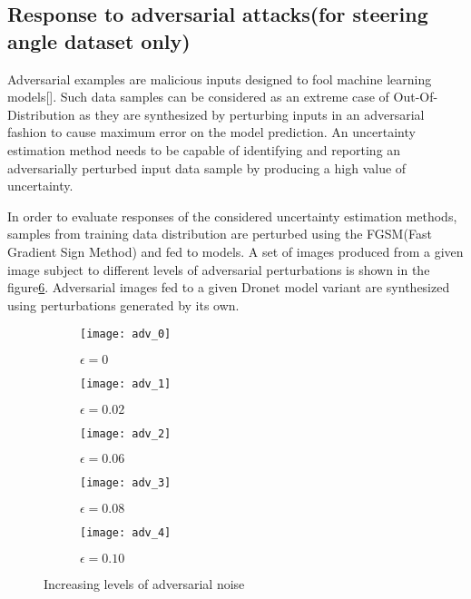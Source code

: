 \subsection{Response to adversarial attacks(for steering angle dataset only)}
Adversarial examples are malicious inputs designed to fool machine learning models[\cite{kurakin2016adversarial}]. Such data samples can be considered as an extreme case of Out-Of-Distribution as they are synthesized by perturbing inputs in an adversarial fashion to cause maximum error on the model prediction. An uncertainty estimation method needs to be capable of identifying and reporting an adversarially perturbed input data sample by producing a high value of uncertainty. 

In order to evaluate responses of the considered uncertainty estimation methods, samples from training data distribution are perturbed using the FGSM(Fast Gradient Sign Method)\cite{goodfellow2015explaining} and fed to models. A set of images produced from a given image subject to different levels of adversarial perturbations is shown in the figure\ref{fig_adv_example}. Adversarial images fed to a given Dronet model variant are synthesized using perturbations generated by its own.  

\begin{figure}[H]
	\centering
	\begin{subfigure}[b]{0.19\textwidth}
		\centering
		\texttt{[image: adv\_0]}
		\caption{$\epsilon=0$}
		\label{fig:y equals x}
	\end{subfigure}
	\hfill
	\begin{subfigure}[b]{0.19\textwidth}
		\centering
		\texttt{[image: adv\_1]}
		\caption{$\epsilon=0.02$}
		\label{fig:three sin x}
	\end{subfigure}
	\hfill
	\begin{subfigure}[b]{0.19\textwidth}
		\centering
		\texttt{[image: adv\_2]}
		\caption{$\epsilon=0.06$}
		\label{fig:five over x}
	\end{subfigure}
	\hfill
	\begin{subfigure}[b]{0.19\textwidth}
		\centering
		\texttt{[image: adv\_3]}
		\caption{$\epsilon=0.08$}
		\label{fig:five over x}
	\end{subfigure}
	\hfill
	\begin{subfigure}[b]{0.19\textwidth}
		\centering
		\texttt{[image: adv\_4]}
		\caption{$\epsilon=0.10$}
		\label{fig:five over x}
	\end{subfigure}
	\caption{Increasing levels of adversarial noise}
	\label{fig_adv_example}
\end{figure}

